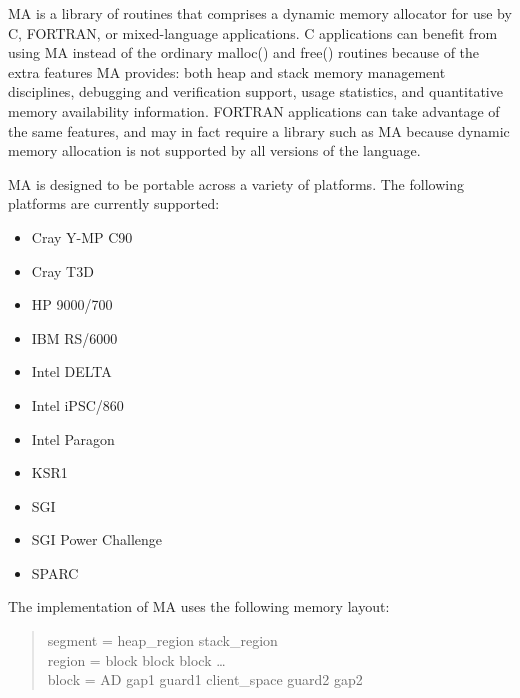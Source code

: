 
\setlength{\topmargin}{0in}
\setlength{\headheight}{0in}
\setlength{\headsep}{0in}
\setlength{\topskip}{0in}
\setlength{\textheight}{8.5in}
\setlength{\footheight}{10pt}
\setlength{\footskip}{0.5in}

\setlength{\textwidth}{6.5in}
\setlength{\oddsidemargin}{0in}
\setlength{\evensidemargin}{0in}
\setlength{\marginparwidth}{0in}
\setlength{\parindent}{0in}



MA is a library of routines that comprises a dynamic memory allocator
for use by C, FORTRAN, or mixed-language applications.  C applications
can benefit from using MA instead of the ordinary malloc() and free()
routines because of the extra features MA provides:  both heap and
stack memory management disciplines, debugging and verification
support, usage statistics, and quantitative memory availability
information.  FORTRAN applications can take advantage of the same
features, and may in fact require a library such as MA because dynamic
memory allocation is not supported by all versions of the language.

MA is designed to be portable across a variety of platforms.
The following platforms are currently supported:

\begin{itemize}
\item Cray Y-MP C90
\item Cray T3D
\item HP 9000/700
\item IBM RS/6000
\item Intel DELTA
\item Intel iPSC/860
\item Intel Paragon
\item KSR1
\item SGI
\item SGI Power Challenge
\item SPARC
\end{itemize}

The implementation of MA uses the following memory layout:

\begin{quote}
segment = heap\_region stack\_region \\
region = block block block \ldots \\
block = AD gap1 guard1 client\_space guard2 gap2
\end{quote}

